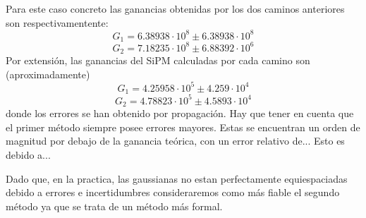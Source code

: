 \begin{itemize}
\begin{itemize}
	
	\end{itemize}
	
Para este caso concreto las ganancias obtenidas por los dos caminos anteriores son respectivamentente:
$$G_1= 6.38938 \cdot 10^8 \pm  6.38938 \cdot 10^8 $$  
$$G_2=7.18235 \cdot 10^8 \pm 6.88392 \cdot 10^6$$
Por extensión, las ganancias del SiPM calculadas por cada camino son (aproximadamente) 
$$G_1= 4.25958 \cdot 10^5 \pm 4.259 \cdot 10^4$$  
$$G_2= 4.78823 \cdot 10^5 \pm 4.5893 \cdot 10^4$$
donde los errores se han obtenido por propagación. Hay que tener en cuenta que el primer método siempre posee errores mayores. Estas se encuentran un orden de magnitud por debajo de la ganancia teórica, con un error relativo de... Esto es debido a...

Dado que, en la practica, las gaussianas no estan perfectamente equiespaciadas debido a errores e incertidumbres consideraremos como más fiable el segundo método ya que se trata de un método más formal. 


\end{itemize}